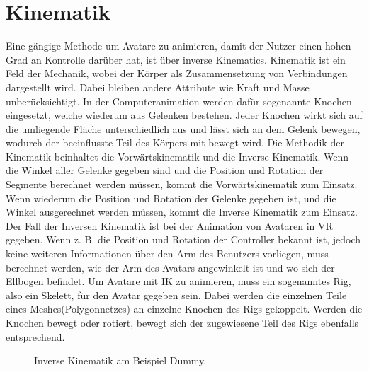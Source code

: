 \section{Kinematik}
Eine gängige Methode um Avatare zu animieren, damit der Nutzer einen hohen Grad an Kontrolle darüber hat, ist über inverse Kinematics. Kinematik ist ein Feld der Mechanik, wobei der Körper als Zusammensetzung von Verbindungen dargestellt wird. Dabei bleiben andere Attribute wie Kraft und Masse unberücksichtigt. In der Computeranimation werden dafür sogenannte Knochen eingesetzt, welche wiederum aus Gelenken bestehen. Jeder Knochen wirkt sich auf die umliegende Fläche unterschiedlich aus und lässt sich an dem Gelenk bewegen, wodurch der beeinflusste Teil des Körpers mit bewegt wird.
Die Methodik der Kinematik beinhaltet die Vorwärtskinematik und die Inverse Kinematik. Wenn die Winkel aller Gelenke gegeben sind und die Position und Rotation der Segmente berechnet werden müssen, kommt die Vorwärtskinematik zum Einsatz. Wenn wiederum die Position und Rotation der Gelenke gegeben ist, und die Winkel ausgerechnet werden müssen, kommt die Inverse Kinematik zum Einsatz. Der Fall der Inversen Kinematik ist bei der Animation von Avataren in VR gegeben. Wenn z. B. die Position und Rotation der Controller bekannt ist, jedoch keine weiteren Informationen über den Arm des Benutzers vorliegen, muss berechnet werden, wie der Arm des Avatars angewinkelt ist und wo sich der Ellbogen befindet.\cite{Xia2009}
Um Avatare mit IK zu animieren, muss ein sogenanntes Rig, also ein Skelett, für den Avatar gegeben sein. Dabei werden die einzelnen Teile eines Meshes(Polygonnetzes) an einzelne Knochen des Rigs gekoppelt. Werden die Knochen bewegt oder rotiert, bewegt sich der zugewiesene Teil des Rigs ebenfalls entsprechend.
\begin{figure}[h]
  \caption[Inverse Kinematik am Beispiel Dummy]{Inverse Kinematik am Beispiel Dummy.}
  \label{fig:IKDummy}
\end{figure}
